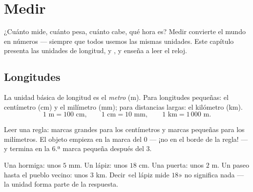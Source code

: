 \chapter{Medir}\label{ch:g3:measure}

¿Cuánto mide, cuánto pesa, cuánto cabe, qué hora es? Medir
convierte el mundo en números --- siempre que todos usemos las mismas
unidades. Este capítulo presenta las unidades de longitud,  y ,
y enseña a leer el reloj.

\section{Longitudes}

\begin{definition}\label{def:g3:measure:length}
La unidad básica de longitud es el \emph{metro} (m). Para longitudes pequeñas:
el centímetro (cm) y el milímetro (mm); para distancias largas: el
kilómetro (km).
\[
1 \text{ m} = 100 \text{ cm}, \qquad
1 \text{ cm} = 10 \text{ mm}, \qquad
1 \text{ km} = 1\,000 \text{ m}.
\]
\end{definition}

\begin{omfigure}

{\small Leer una regla: marcas grandes para los centímetros y marcas pequeñas para los
milímetros. El objeto empieza en la marca del $0$ --- ¡no en el borde de
la regla! --- y termina en la $6$.ª marca pequeña después del $3$.}
\end{omfigure}

\begin{example}\label{ex:g3:measure:choose}
Una hormiga: unos $5$ mm. Un lápiz: unos $18$ cm. Una puerta: unos $2$ m.
Un paseo hasta el pueblo vecino: unos $3$ km. Decir «el lápiz mide
$18$» no significa nada --- la unidad forma parte de la respuesta.
\end{example}

